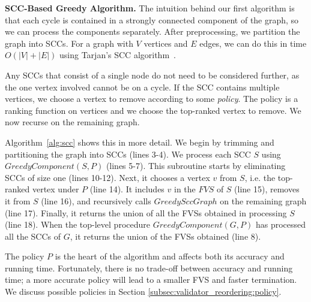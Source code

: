 \begin{algorithm}[t]
\SetAlgoLined\DontPrintSemicolon
{}
\caption{Sort-based greedy algorithm}
\label{alg:sort}
\end{algorithm}




{\bf SCC-Based Greedy Algorithm.} The intuition behind our first algorithm is that each cycle is contained in a strongly connected component of the graph, so we can process the components separately. After preprocessing, we partition the graph into SCCs. For a graph with $V$ vertices and $E$ edges, we can do this in time $O(|V|+|E|)$ using Tarjan's SCC algorithm~\cite{tarjan1972depth}.

Any SCCs that consist of a single node do not need to be considered further, as the one vertex involved cannot be on a cycle. If the SCC contains multiple vertices, we choose a vertex to remove according to some \emph{policy}. The policy is a ranking function on vertices and we choose the top-ranked vertex to remove. We now recurse on the remaining graph.

Algorithm~\ref{alg:scc} shows this in more detail. We begin by trimming and partitioning the graph into SCCs  (lines 3-4). We process each SCC $S$ using $GreedyComponent(S, P)$ (lines 5-7). This subroutine starts by eliminating SCCs of size one (lines 10-12). Next, it chooses a vertex $v$ from $S$, i.e. the top-ranked vertex under $P$ (line 14). It includes $v$ in the $FVS$ of $S$ (line 15), removes it from $S$ (line 16), and recursively calls $GreedySccGraph$ on the remaining graph (line 17). Finally, it returns the union of all the FVSs obtained in processing $S$ (line 18). When the top-level procedure $GreedyComponent(G, P)$ has processed all the SCCs of $G$, it returns the union of the FVSs obtained (line 8).

The policy $P$ is the heart of the algorithm and affects both its accuracy and running time. Fortunately, there is no trade-off between accuracy and running time; a more accurate policy will lead to a smaller FVS and faster termination. We discuss possible policies in Section \ref{subsec:validator_reordering:policy}.

